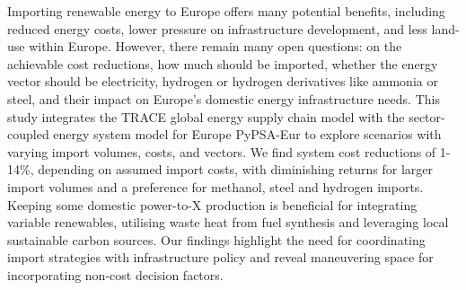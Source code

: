 
Importing renewable energy to Europe offers many potential benefits, including
reduced energy costs, lower pressure on infrastructure development, and
less land-use within Europe.
However, there remain many open questions: on the achievable cost reductions,
how much should be imported, whether the energy vector should be electricity,
hydrogen or hydrogen derivatives like ammonia or steel, and their impact on
Europe's domestic energy infrastructure needs.
This study integrates the TRACE global energy supply chain model with the
sector-coupled energy system model for Europe PyPSA-Eur to explore scenarios
with varying import volumes, costs, and vectors.
We find system cost reductions of 1-14\%, depending on assumed import costs,
with diminishing returns for larger import volumes and a preference for
methanol, steel and hydrogen imports. Keeping some domestic power-to-X
production is beneficial for integrating variable renewables, utilising waste
heat from fuel synthesis and leveraging local sustainable carbon sources.
Our findings highlight the need for coordinating import strategies with
infrastructure policy and reveal maneuvering space for incorporating non-cost
decision factors.

